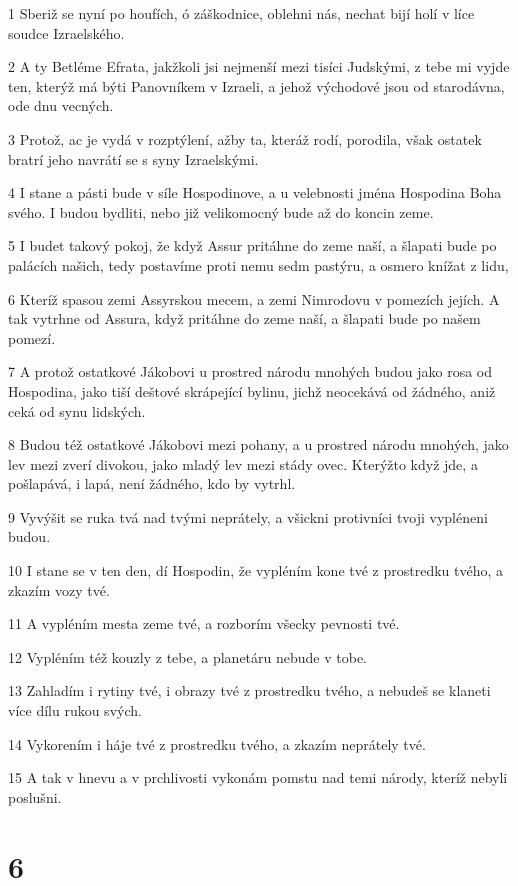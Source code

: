 \par 1 Sberiž se nyní po houfích, ó záškodnice, oblehni nás, nechat bijí holí v líce soudce Izraelského.
\par 2 A ty Betléme Efrata, jakžkoli jsi nejmenší mezi tisíci Judskými, z tebe mi vyjde ten, kterýž má býti Panovníkem v Izraeli, a jehož východové jsou od starodávna, ode dnu vecných.
\par 3 Protož, ac je vydá v rozptýlení, ažby ta, kteráž rodí, porodila, však ostatek bratrí jeho navrátí se s syny Izraelskými.
\par 4 I stane a pásti bude v síle Hospodinove, a u velebnosti jména Hospodina Boha svého. I budou bydliti, nebo již velikomocný bude až do koncin zeme.
\par 5 I budet takový pokoj, že když Assur pritáhne do zeme naší, a šlapati bude po palácích našich, tedy postavíme proti nemu sedm pastýru, a osmero knížat z lidu,
\par 6 Kteríž spasou zemi Assyrskou mecem, a zemi Nimrodovu v pomezích jejích. A tak vytrhne od Assura, když pritáhne do zeme naší, a šlapati bude po našem pomezí.
\par 7 A protož ostatkové Jákobovi u prostred národu mnohých budou jako rosa od Hospodina, jako tiší deštové skrápející bylinu, jichž neocekává od žádného, aniž ceká od synu lidských.
\par 8 Budou též ostatkové Jákobovi mezi pohany, a u prostred národu mnohých, jako lev mezi zverí divokou, jako mladý lev mezi stády ovec. Kterýžto když jde, a pošlapává, i lapá, není žádného, kdo by vytrhl.
\par 9 Vyvýšit se ruka tvá nad tvými neprátely, a všickni protivníci tvoji vypléneni budou.
\par 10 I stane se v ten den, dí Hospodin, že vypléním kone tvé z prostredku tvého, a zkazím vozy tvé.
\par 11 A vypléním mesta zeme tvé, a rozborím všecky pevnosti tvé.
\par 12 Vypléním též kouzly z tebe, a planetáru nebude v tobe.
\par 13 Zahladím i rytiny tvé, i obrazy tvé z prostredku tvého, a nebudeš se klaneti více dílu rukou svých.
\par 14 Vykorením i háje tvé z prostredku tvého, a zkazím neprátely tvé.
\par 15 A tak v hnevu a v prchlivosti vykonám pomstu nad temi národy, kteríž nebyli poslušni.

\chapter{6}

